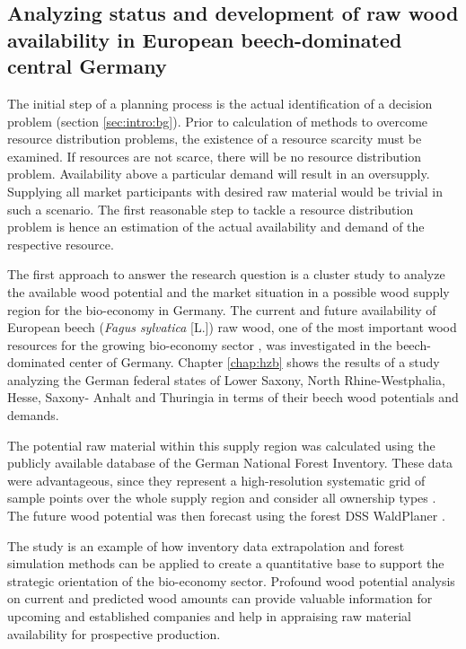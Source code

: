 \subsection{Analyzing status and development of raw wood availability in European beech-dominated central Germany}
\label{subsec:intro:struct:hzb}
The initial step of a planning process is the actual identification of a decision problem (section \ref{sec:intro:bg}). Prior to calculation of methods to overcome resource distribution problems, the existence of a resource scarcity must be examined. If resources are not scarce, there will be no resource distribution problem. Availability above a particular demand will result in an oversupply. Supplying all market participants with desired raw material would be trivial in such a scenario. The first reasonable step to tackle a resource distribution problem is hence an estimation of the actual availability and demand of the respective resource.

The first approach to answer the research question is a cluster study to analyze the available wood potential and the market situation in a possible wood supply region for the bio-economy in Germany. The current and future availability of European beech (\textit{Fagus sylvatica} [L.]) raw wood, one of the most important wood resources for the growing bio-economy sector \citep[p. 16]{auer_2016}, was investigated in the beech-dominated center of Germany. Chapter \ref{chap:hzb} shows the results of a study analyzing the German federal states of Lower Saxony, North Rhine-Westphalia, Hesse, Saxony- Anhalt and Thuringia in terms of their beech wood potentials and demands.

The potential raw material within this supply region was calculated using the publicly available database of the German National Forest Inventory. These data were advantageous, since they represent a high-resolution systematic grid of sample points over the whole supply region and consider all ownership types \citep{schmitz_2008}. The future wood potential was then forecast using the forest DSS WaldPlaner \citep{hansen_2014}.

The study is an example of how inventory data extrapolation and forest simulation methods can be applied to create a quantitative base to support the strategic orientation of the bio-economy sector. Profound wood potential analysis on current and predicted wood amounts can provide valuable information for upcoming and established companies and help in appraising raw material availability for prospective production.


